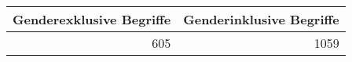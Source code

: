 
\begin{tabular}{rr}
\toprule
Genderexklusive Begriffe & Genderinklusive Begriffe\\
\midrule
605 & 1059\\
\bottomrule
\end{tabular}